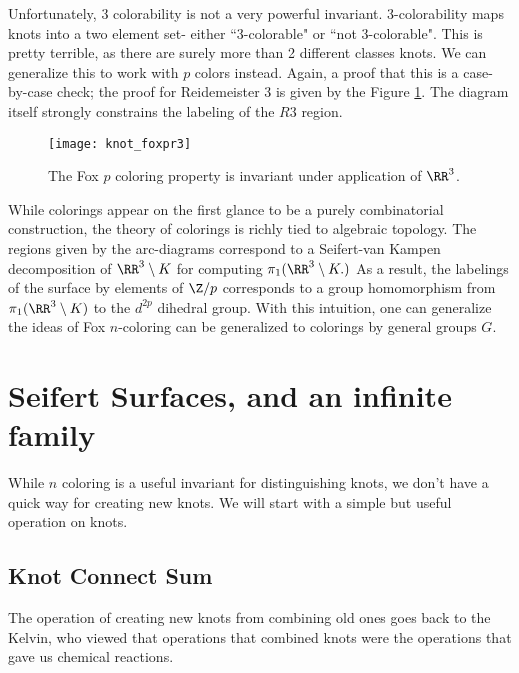 Unfortunately, 3 colorability is not a very powerful invariant. 3-colorability maps knots into a two element set- either ``3-colorable" or ``not 3-colorable". This is pretty terrible, as there are surely more than 2 different classes knots. We can generalize this to work with $p$ colors instead.  
Again, a proof that this is a case-by-case check; the proof for Reidemeister 3 is given by the Figure \ref{fig:knot_foxpr3}.  The diagram itself strongly constrains the labeling of the $R3$ region.  
\begin{figure}
\centering
\texttt{[image: knot\_foxpr3]}
\caption{The Fox $p$ coloring property is invariant under application of $\RR^3$. }
\label{fig:knot_foxpr3}
\end{figure}
While colorings appear on the first glance to be a purely combinatorial construction, the theory of colorings is richly tied to algebraic topology. The regions given by the arc-diagrams correspond to a Seifert-van Kampen decomposition of $\RR^3\setminus K$ for computing $\pi_1(\RR^3\setminus K.)$ As a result, the labelings of the surface by elements of $\Z/p$ corresponds to a group homomorphism from $\pi_1(\RR^3\setminus K)$ to the \project \label{proj:groupcoloring} $d^{2p}$ dihedral group. With this intuition, one can generalize the ideas of Fox $n$-coloring can be generalized to colorings by general groups $G$. 
\section{Seifert Surfaces, and an infinite family}
While $n$ coloring is a useful invariant for distinguishing knots, we don't have a quick way for creating new knots. We will start with a simple but useful operation on knots. 
\subsection{Knot Connect Sum}
The operation of creating new knots from combining old ones goes back to the Kelvin, who viewed that operations that combined knots were the operations that gave us chemical reactions. 


